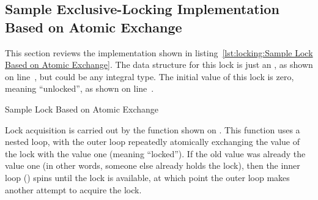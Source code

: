 \subsection{Sample Exclusive-Locking Implementation Based on Atomic Exchange}
\label{sec:locking:Sample Exclusive-Locking Implementation Based on Atomic Exchange}

\begin{fcvref}
This section reviews the implementation shown in
listing~\ref{lst:locking:Sample Lock Based on Atomic Exchange}.
The data structure for this lock is just an , as shown on
line~, but could be any integral type.
The initial value of this lock is zero, meaning ``unlocked'',
as shown on line~.
\end{fcvref}

\begin{listing}[tbp]

\caption{Sample Lock Based on Atomic Exchange}
\label{lst:locking:Sample Lock Based on Atomic Exchange}
\end{listing}

\QuickQuizEnd

\begin{fcvref}
Lock acquisition is carried out by the  function
shown on .
This function uses a nested loop, with the outer loop repeatedly
atomically exchanging the value of the lock with the value one
(meaning ``locked'').
If the old value was already the value one (in other words, someone
else already holds the lock), then the inner loop ()
spins until the lock is available, at which point the outer loop
makes another attempt to acquire the lock.
\end{fcvref}

